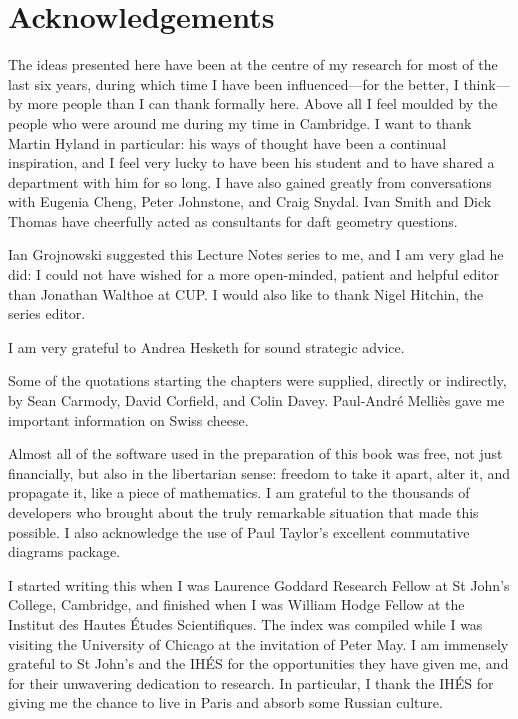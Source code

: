 
\chapter{Acknowledgements}

The ideas presented here have been at the centre of my research for most of
the last six years, during which time I have been influenced---for the
better, I think---by more people than I can thank formally here.  Above all
I feel moulded by the people who were around me during my time in
Cambridge.  I want to thank Martin Hyland in particular: his ways of
thought have been a continual inspiration, and I feel very lucky to have
been his student and to have shared a department with him for so long.  I
have also gained greatly from conversations with Eugenia Cheng, Peter
Johnstone, and Craig Snydal.  Ivan Smith and Dick Thomas have cheerfully
acted as consultants for daft geometry questions.

Ian Grojnowski suggested this Lecture Notes series to me, and I am very
glad he did: I could not have wished for a more open-minded, patient and
helpful editor than Jonathan Walthoe at CUP.  I would also like to thank
Nigel Hitchin, the series editor.

I am very grateful to Andrea Hesketh for sound strategic advice.

Some of the quotations starting the chapters were supplied, directly or
indirectly, by Sean Carmody, David Corfield, and Colin Davey.  Paul-Andr\'e
Melli\`es gave me important information on Swiss cheese.

Almost all of the software used in the preparation of this book was free,
not just financially, but also in the libertarian sense: freedom to take it
apart, alter it, and propagate it, like a piece of mathematics.  I am
grateful to the thousands of developers who brought about the truly
remarkable situation that made this possible.  I also acknowledge the use
of Paul Taylor's excellent commutative diagrams package.

I started writing this when I was Laurence Goddard Research Fellow at St
John's College, Cambridge, and finished when I was William Hodge Fellow at
the Institut des Hautes \'Etudes Scientifiques.  The index was compiled
while I was visiting the University of Chicago at the invitation of Peter
May.  I am immensely grateful to St John's and the IH\'ES for the
opportunities they have given me, and for their unwavering dedication to
research.  In particular, I thank the IH\'ES for giving me the chance to
live in Paris and absorb some Russian culture.

